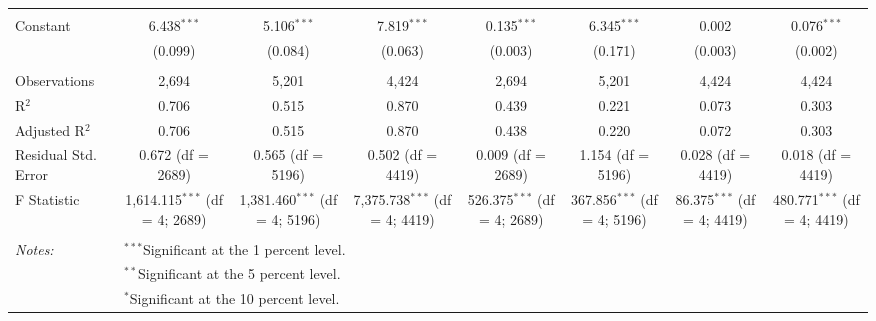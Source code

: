 \begin{table}[!htbp]
\begin{tabular}{@{\extracolsep{5pt}}lccccccc}
  & & & & & & & \\ 
 Constant & 6.438$^{***}$ & 5.106$^{***}$ & 7.819$^{***}$ & 0.135$^{***}$ & 6.345$^{***}$ & 0.002 & 0.076$^{***}$ \\ 
  & (0.099) & (0.084) & (0.063) & (0.003) & (0.171) & (0.003) & (0.002) \\ 
  & & & & & & & \\ 
Observations & 2,694 & 5,201 & 4,424 & 2,694 & 5,201 & 4,424 & 4,424 \\ 
R$^{2}$ & 0.706 & 0.515 & 0.870 & 0.439 & 0.221 & 0.073 & 0.303 \\ 
Adjusted R$^{2}$ & 0.706 & 0.515 & 0.870 & 0.438 & 0.220 & 0.072 & 0.303 \\ 
Residual Std. Error & 0.672 (df = 2689) & 0.565 (df = 5196) & 0.502 (df = 4419) & 0.009 (df = 2689) & 1.154 (df = 5196) & 0.028 (df = 4419) & 0.018 (df = 4419) \\ 
F Statistic & 1,614.115$^{***}$ (df = 4; 2689) & 1,381.460$^{***}$ (df = 4; 5196) & 7,375.738$^{***}$ (df = 4; 4419) & 526.375$^{***}$ (df = 4; 2689) & 367.856$^{***}$ (df = 4; 5196) & 86.375$^{***}$ (df = 4; 4419) & 480.771$^{***}$ (df = 4; 4419) \\ 
\hline \\[-1.8ex] 
\textit{Notes:} & \multicolumn{7}{l}{$^{***}$Significant at the 1 percent level.} \\ 
 & \multicolumn{7}{l}{$^{**}$Significant at the 5 percent level.} \\ 
 & \multicolumn{7}{l}{$^{*}$Significant at the 10 percent level.} \\ 
\end{tabular} 
\end{table} 
